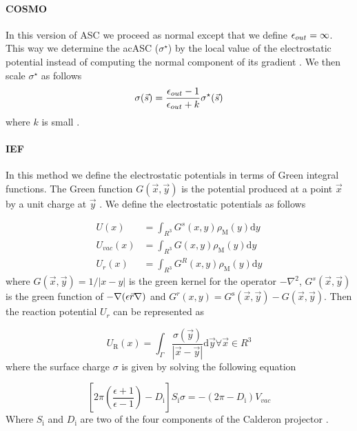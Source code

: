 \documentclass[../master_thesis.tex]{subfiles}
\begin{document}
\paragraph{\ac{COSMO}}
In this version of \ac{ASC} we proceed as normal except that we define $\epsilon_{out} = \infty$.
This way we determine the {ac{ASC}} ($\sigma^{\star}$) by the local value of the electrostatic
potential instead of computing the normal component of its gradient \cite{Tomasi:2005ipa}.
We then scale $\sigma^{\star}$ as follows
\begin{equation}
  \sigma(\vec{s}) = \frac{\epsilon_{out} -1}{\epsilon_{out} + k}\sigma^{\star}(\vec{s})
\end{equation}
where $k$ is small \cite{Tomasi:2005ipa}.

\paragraph{\ac{IEF}}
In this method we define the electrostatic potentials in terms of Green integral
functions. The Green function $G(\vec{x}, \vec{y})$ is the potential produced at
a point $\vec{x}$ by a unit charge at $\vec{y}$ \cite{Tomasi:2005ipa}. We define
the electrostatic potentials as follows

\begin{equation}
\begin{aligned} U(x) &=\int_{R^{3}} G^{s}(x, y) \rho_{\mathrm{M}}(y) \mathrm{d} y \\
  U_{vac}(x) &=\int_{R^{3}} G(x, y) \rho_{\mathrm{M}}(y) \mathrm{d} y \\
  U_{r}(x) &=\int_{R^{3}} G^{R}(x, y) \rho_{\mathrm{M}}(y) \mathrm{d} y \end{aligned}
\end{equation}
where $G(\vec{x}, \vec{y})=1 /|x-y|$ is the green kernel for the operator
$-\nabla^2$, $G^s(\vec{x}, \vec{y})$  is the green function of
$-\nabla(\epsilon{\vec{r}}\nabla)$ and $G^{r}(x, y)=G^{\mathrm{s}}(\vec{x},
\vec{y})-G(\vec{x}, \vec{y})$. Then the reaction potential $U_r$ can be represented
as  \cite{Tomasi:2005ipa}

\begin{equation}
U_{\mathrm{R}}(x)=\int_{\Gamma} \frac{\sigma(\vec{y})}{|\vec{x}-\vec{y}|}
\mathrm{d} \vec{y} \forall \vec{x} \in R^{3}
\end{equation}
where the surface charge $\sigma$ is given by solving the following equation

\begin{equation}
\left[2 \pi\left(\frac{\epsilon+1}{\epsilon-1}\right)-D_{\mathrm{i}}\right] S_{\mathrm{i}} \sigma=-\left(2 \pi-D_{\mathrm{i}}\right) V_{vac}
\end{equation}
Where $S_{\mathrm{i}}$ and  $D_{\mathrm{i}}$ are two of the four components of the Calderon projector \cite{Tomasi:2005ipa}.
\end{document}
